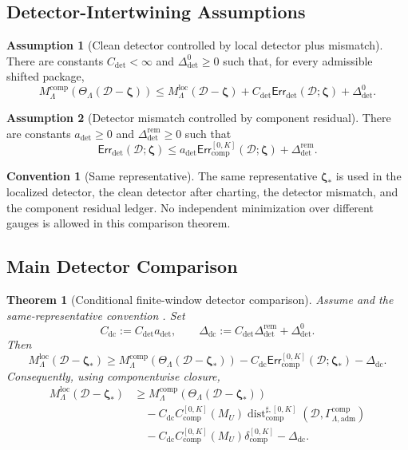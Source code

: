\documentclass[11pt]{article}
\numberwithin{equation}{section}
\newtheorem{theorem}{Theorem}[section]
\theoremstyle{definition}
\newtheorem{assumption}[assumption]{Assumption}
\newtheorem{convention}[convention]{Convention}
\theoremstyle{remark}
\newcommand{\loc}{\mathrm{loc}}
\newcommand{\adm}{\mathrm{adm}}
\newcommand{\comp}{\mathrm{comp}}
\newcommand{\detc}{\mathrm{det}}
\newcommand{\Err}{\mathsf{Err}}
\newcommand{\Dist}{\operatorname{dist}}
\newcommand{\calD}{\mathcal D}
\newcommand{\bzeta}{\boldsymbol\zeta}
\newcommand{\Gcomp}{\Gamma_{\Lambda,\adm}^{\comp}}
\begin{document}
\subsection{Detector-Intertwining Assumptions}
\label{sec:assumptions}

\begin{assumption}[Clean detector controlled by local detector plus mismatch]
\label{ass:detector-lipschitz}
There are constants \(C_{\detc}<\infty\) and \(\Delta_{\detc}^{0}\ge0\) such
that, for every admissible shifted package,
\[
    M_{\Lambda}^{\comp}(\Theta_{\Lambda}(\calD-\bzeta))
    \le
    M_{\Lambda}^{\loc}(\calD-\bzeta)
    +
    C_{\detc}\Err_{\detc}(\calD;\bzeta)
    +
    \Delta_{\detc}^{0}.
\]
\end{assumption}

\begin{assumption}[Detector mismatch controlled by component residual]
\label{ass:detector-residual-control}
There are constants \(a_{\detc}\ge0\) and
\(\Delta_{\detc}^{\mathrm{rem}}\ge0\) such that
\[
    \Err_{\detc}(\calD;\bzeta)
    \le
    a_{\detc}
    \Err_{\comp}^{[0,K]}(\calD;\bzeta)
    +
    \Delta_{\detc}^{\mathrm{rem}}.
\]
\end{assumption}

\begin{convention}[Same representative]
\label{conv:same-representative}
The same representative \(\bzeta_*\) is used in the localized detector, the
clean detector after charting, the detector mismatch, and the component residual
ledger.  No independent minimization over different gauges is allowed in this
comparison theorem.
\end{convention}

\subsection{Main Detector Comparison}
\label{sec:main}

\begin{theorem}[Conditional finite-window detector comparison]
\label{thm:detector-comparison}
Assume 
and the same-representative convention .  Set
\[
    C_{\mathrm{dc}}
    :=
    C_{\detc}a_{\detc},
    \qquad
    \Delta_{\mathrm{dc}}
    :=
    C_{\detc}\Delta_{\detc}^{\mathrm{rem}}
    +
    \Delta_{\detc}^{0}.
\]
Then
\[
    M_{\Lambda}^{\loc}(\calD-\bzeta_*)
    \ge
    M_{\Lambda}^{\comp}(\Theta_{\Lambda}(\calD-\bzeta_*))
    -
    C_{\mathrm{dc}}
    \Err_{\comp}^{[0,K]}(\calD;\bzeta_*)
    -
    \Delta_{\mathrm{dc}}.
\]
Consequently, using componentwise closure,
\[
\begin{aligned}
    M_{\Lambda}^{\loc}(\calD-\bzeta_*)
    &\ge
    M_{\Lambda}^{\comp}(\Theta_{\Lambda}(\calD-\bzeta_*))\\
    &\quad-
    C_{\mathrm{dc}}C_{\comp}^{[0,K]}(M_U)
    \Dist_{\comp}^{\sharp,[0,K]}(\calD,\Gcomp)\\
    &\quad-
    C_{\mathrm{dc}}C_{\comp}^{[0,K]}(M_U)
    \delta_{\comp}^{[0,K]}
    -
    \Delta_{\mathrm{dc}}.
\end{aligned}
\]
\end{theorem}
\end{document}
